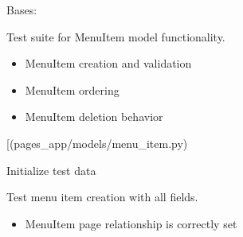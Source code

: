 \documentclass[letterpaper,10pt,english]{sphinxmanual}
\begin{document}
\begin{fulllineitems}
\label{\detokenize{pages_app.tests:pages_app.tests.test_models.MenuItemModelTest}}
\pysigstartsignatures
\pysiglinewithargsret
{}
{}
{}
\pysigstopsignatures
\sphinxAtStartPar
Bases: 

\sphinxAtStartPar
Test suite for MenuItem model functionality.
\begin{description}
\begin{itemize}
\item {} 
\sphinxAtStartPar
MenuItem creation and validation

\item {} 
\sphinxAtStartPar
MenuItem ordering

\item {} 
\sphinxAtStartPar
MenuItem deletion behavior

\end{itemize}

\sphinxAtStartPar
{[}\sphinxtitleref{MenuItem}{]}(pages\_app/models/menu\_item.py)

\end{description}

\begin{fulllineitems}
\label{\detokenize{pages_app.tests:pages_app.tests.test_models.MenuItemModelTest.setUp}}
\pysigstartsignatures
\pysiglinewithargsret
{}
{}
{}
\pysigstopsignatures
\sphinxAtStartPar
Initialize test data

\end{fulllineitems}


\begin{fulllineitems}
\label{\detokenize{pages_app.tests:pages_app.tests.test_models.MenuItemModelTest.test_menu_item_creation}}
\pysigstartsignatures
\pysiglinewithargsret
{}
{}
{}
\pysigstopsignatures
\sphinxAtStartPar
Test menu item creation with all fields.
\begin{description}
\begin{itemize}
\item {} 
\sphinxAtStartPar
MenuItem page relationship is correctly set


\end{itemize}
\end{description}
\end{fulllineitems}
\end{fulllineitems}
\end{document}
